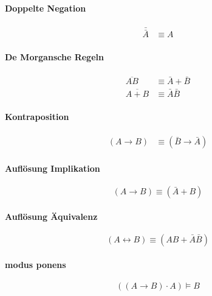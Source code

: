 \documentclass[../main.tex]{subfiles}
\begin{document}
        \paragraph{Doppelte Negation}
            \begin{align}
                \bar{\bar{A}} &\equiv A
            \end{align}
        
        \paragraph{De Morgansche Regeln}
            \begin{subequations}
                \begin{align}
                    \overline{AB} &\equiv \bar{A} + \bar{B}\\
                    \overline{A + B} &\equiv \bar{A}\bar{B}
                \end{align}
            \end{subequations}
        
        \paragraph{Kontraposition}
            \begin{align}
                (A \rightarrow B) &\equiv (\bar{B} \rightarrow \bar{A})
            \end{align}
        
        \paragraph{Auflösung Implikation}
            \begin{equation}
                (A \rightarrow B) \equiv (\bar{A} + B)
            \end{equation}
        
        \paragraph{Auflösung Äquivalenz}
            \begin{equation}
                (A \leftrightarrow B) \equiv (AB + \bar{A}\bar{B})
            \end{equation}
        
        \paragraph{modus ponens}
            \begin{equation}
                ((A \rightarrow B) \cdot A) \models B
            \end{equation}
            
\end{document}
